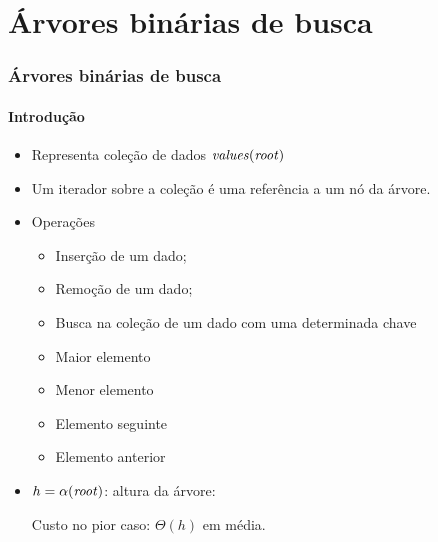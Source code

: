 \documentclass{beamer}
\begin{document}

\section{Árvores binárias de busca}

\begin{frame}

\frametitle{Árvores binárias de busca}
\framesubtitle{Introdução}

\begin{itemize}

\item Representa coleção de dados $\id{values}(\id{root})$

\item Um iterador sobre a coleção é uma referência a um nó da árvore.

\item Operações

      \begin{itemize}

        \item Inserção de um dado;

        \item Remoção de um dado;

        \item Busca na coleção de um dado com uma determinada chave

        \item Maior elemento

        \item Menor elemento

        \item Elemento seguinte

        \item Elemento anterior

\end{itemize}

    \item $h = \alpha(\id{root})$: altura da árvore:

      Custo no pior caso: $\Theta(h)$ em média.

\end{itemize}

\end{frame}
\end{document}
